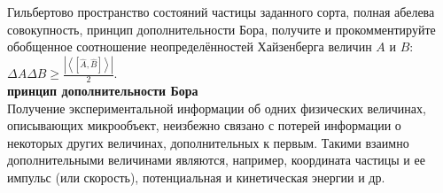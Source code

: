 \documentclass[__main__.tex]{subfiles}
\begin{document}
Гильбертово пространство состояний частицы заданного сорта, полная абелева совокупность, принцип дополнительности Бора, получите и прокомментируйте обобщенное соотношение неопределённостей Хайзенберга величин $A$ и $B$: $\Delta{A}\Delta{B}\ge\frac{\left|\left<\left[\hat{A},\hat{B}\right]\right>\right|}{2}$.\\ 

\textbf{принцип дополнительности Бора}\\
Получение экспериментальной информации об одних физических величинах, описывающих микрообъект, неизбежно связано с потерей информации о некоторых других величинах, дополнительных к первым. Такими взаимно дополнительными величинами являются, например, координата частицы и ее импульс (или скорость), потенциальная и кинетическая энергии и др.
\end{document}
